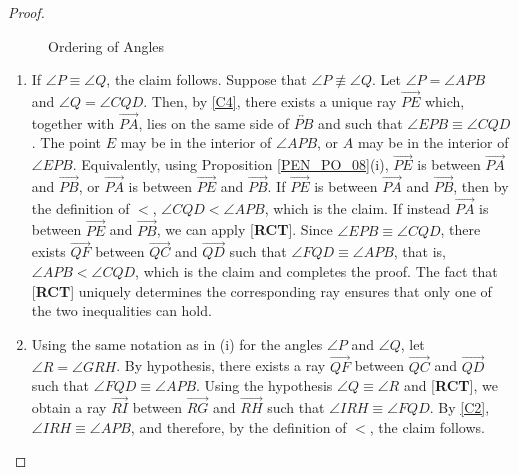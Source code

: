 \documentclass[11pt,a4paper]{article}
\theoremstyle{definition}
\theoremstyle{remark}
\numberwithin{equation}{section}
\begin{document}
\begin{proof}
\begin{figure}[ht!]
  \caption{Ordering of Angles}\label{PEN_CP12_fn}
\end{figure}
\begin{enumerate}[label=(\roman*)]
  \item If $\angle P\equiv\angle Q$, the claim follows. Suppose that $\angle P \not\equiv \angle Q$. Let $\angle P=\angle APB$ and $\angle Q=\angle CQD$. Then, by \ref{C4}, there exists a unique ray $\overrightarrow{PE}$ which, together with $\overrightarrow{PA}$, lies on the same side of $\overleftrightarrow{PB}$ and such that $\angle EPB\equiv\angle CQD$. The point $E$ may be in the interior of $\angle APB$, or $A$ may be in the interior of $\angle EPB$. Equivalently, using Proposition \ref{PEN_PO_08}(i), $\overrightarrow{PE}$ is between $\overrightarrow{PA}$ and $\overrightarrow{PB}$, or $\overrightarrow{PA}$ is between $\overrightarrow{PE}$ and $\overrightarrow{PB}$. If $\overrightarrow{PE}$ is between $\overrightarrow{PA}$ and $\overrightarrow{PB}$, then by the definition of $<$, $\angle CQD<\angle APB$, which is the claim. If instead $\overrightarrow{PA}$ is between $\overrightarrow{PE}$ and $\overrightarrow{PB}$, we can apply [\textbf{RCT}]. Since $\angle EPB\equiv\angle CQD$, there exists $\overrightarrow{QF}$ between $\overrightarrow{QC}$ and $\overrightarrow{QD}$ such that $\angle FQD\equiv\angle APB$, that is, $\angle APB<\angle CQD$, which is the claim and completes the proof. The fact that [\textbf{RCT}] uniquely determines the corresponding ray ensures that only one of the two inequalities can hold.
  \item Using the same notation as in (i) for the angles $\angle P$ and $\angle Q$, let $\angle R=\angle GRH$. By hypothesis, there exists a ray $\overrightarrow{QF}$ between $\overrightarrow{QC}$ and $\overrightarrow{QD}$ such that $\angle FQD\equiv\angle APB$. Using the hypothesis $\angle Q\equiv\angle R$ and [\textbf{RCT}], we obtain a ray $\overrightarrow{RI}$ between $\overrightarrow{RG}$ and $\overrightarrow{RH}$ such that $\angle IRH\equiv\angle FQD$. By \ref{C2}, $\angle IRH\equiv\angle APB$, and therefore, by the definition of $<$, the claim follows.

\end{enumerate}
\end{proof}
\end{document}
